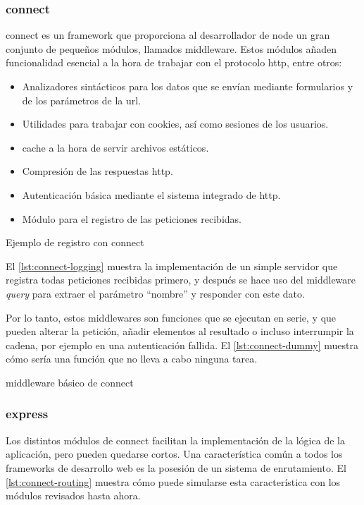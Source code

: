 \documentclass[main]{subfiles}
\begin{document}
\subsubsection[Connect.js]{\Gls{connect}}
\Gls{connect} es un \gls{framework} que proporciona al desarrollador de \gls{node} un gran conjunto de pequeños módulos, llamados \gls{middleware}. Estos módulos añaden funcionalidad esencial a la hora de trabajar con el protocolo \gls{http}, entre otros:

\begin{itemize}
  \item Analizadores sintácticos para los datos que se envían mediante formularios y de los parámetros de la \gls{url}.
  \item Utilidades para trabajar con \glspl{cookie}, así como sesiones de los usuarios.
  \item \Gls{cache} a la hora de servir archivos estáticos.
  \item Compresión de las respuestas \gls{http}.
  \item Autenticación básica mediante el sistema integrado de \gls{http}.
  \item Módulo para el registro de las peticiones recibidas.
\end{itemize}

\begin{listing}
  \caption{Ejemplo de registro con \gls{connect}}
  \label{lst:connect-logging}
\end{listing}

El \cref{lst:connect-logging} muestra la implementación de un simple servidor que registra todas peticiones recibidas primero, y después se hace uso del \gls{middleware} \emph{query} para extraer el parámetro \enquote{nombre} y responder con este dato.

Por lo tanto, estos \glspl{middleware} son funciones que se ejecutan en serie, y que pueden alterar la petición, añadir elementos al resultado o incluso interrumpir la cadena, por ejemplo en una autenticación fallida. El \cref{lst:connect-dummy} muestra cómo sería una función que no lleva a cabo ninguna tarea.

\begin{listing}
  \caption{\Gls{middleware} básico de \gls{connect}}
  \label{lst:connect-dummy}
\end{listing}


\subsubsection[Express.js]{\Gls{express}}
Los distintos módulos de \gls{connect} facilitan la implementación de la lógica de la aplicación, pero pueden quedarse cortos. Una característica común a todos los \glspl{framework} de desarrollo web es la posesión de un sistema de enrutamiento. El \cref{lst:connect-routing} muestra cómo puede simularse esta característica con los módulos revisados hasta ahora.
\end{document}
